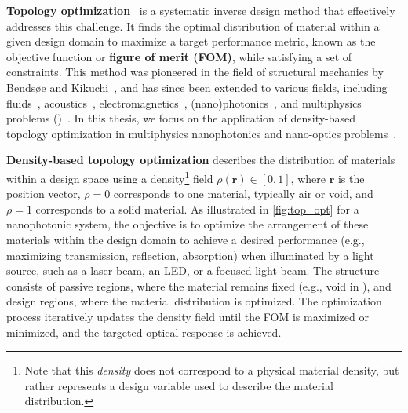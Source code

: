 \textbf{Topology optimization}~\cite{topopt_book} is a systematic inverse design method that effectively addresses this challenge. It finds the optimal distribution of material within a given design domain to maximize a target performance metric,
 known as the objective function or \textbf{figure of merit (FOM)}, while satisfying a set of constraints. This method
was pioneered in the field of structural mechanics by Bendsøe and Kikuchi~\cite{bendsoe_kikukchi}, 
and has since been extended to various fields, including fluids~\cite{topopt_fluid}, acoustics~\cite{topopt_acoustic}, 
electromagnetics~\cite{topopt_EM}, (nano)photonics~\cite{topopt_phot}, and multiphysics problems ()~\cite{coupled_topopt}. In this thesis, we focus on the application of density-based~\cite{bendsoe_density, topopt_approaches} 
topology optimization in multiphysics nanophotonics and nano-optics problems~\cite{jensen_review}.

\textbf{Density-based topology optimization} describes the distribution of materials within a design space using a 
density\footnote{Note that this \emph{density} does not correspond to a physical material density, but rather represents a design variable used to describe the material distribution.} field $\rho(\mathbf{r}) \in [0,1]$, where $\mathbf{r}$ is the position vector, $\rho = 0$ corresponds to one material, typically air or void, and $\rho = 1$ corresponds to a solid material.
 As illustrated 
in \autoref{fig:top_opt} for a nanophotonic system, the objective is to optimize the arrangement of these materials within 
the design domain to achieve a desired performance (e.g., maximizing transmission, reflection, absorption) when illuminated by a light source, such as a laser beam, an LED, or a focused light beam. 
The structure consists of passive regions, where the material remains fixed (e.g., void in ), and design regions, where the material distribution 
is optimized. The optimization process iteratively updates the density field until the FOM is maximized or minimized, and the targeted optical response is achieved.

